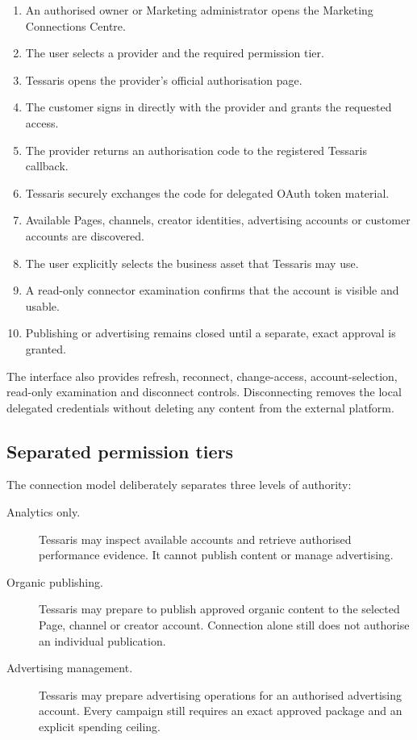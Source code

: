 \begin{enumerate}
    \item An authorised owner or Marketing administrator opens the Marketing Connections Centre.
    \item The user selects a provider and the required permission tier.
    \item Tessaris opens the provider's official authorisation page.
    \item The customer signs in directly with the provider and grants the requested access.
    \item The provider returns an authorisation code to the registered Tessaris callback.
    \item Tessaris securely exchanges the code for delegated OAuth token material.
    \item Available Pages, channels, creator identities, advertising accounts or customer accounts are discovered.
    \item The user explicitly selects the business asset that Tessaris may use.
    \item A read-only connector examination confirms that the account is visible and usable.
    \item Publishing or advertising remains closed until a separate, exact approval is granted.
\end{enumerate}

The interface also provides refresh, reconnect, change-access, account-selection, read-only examination and disconnect controls. Disconnecting removes the local delegated credentials without deleting any content from the external platform.

\subsection{Separated permission tiers}

The connection model deliberately separates three levels of authority:

\begin{description}
    \item[Analytics only.] Tessaris may inspect available accounts and retrieve authorised performance evidence. It cannot publish content or manage advertising.
    \item[Organic publishing.] Tessaris may prepare to publish approved organic content to the selected Page, channel or creator account. Connection alone still does not authorise an individual publication.
    \item[Advertising management.] Tessaris may prepare advertising operations for an authorised advertising account. Every campaign still requires an exact approved package and an explicit spending ceiling.
\end{description}

